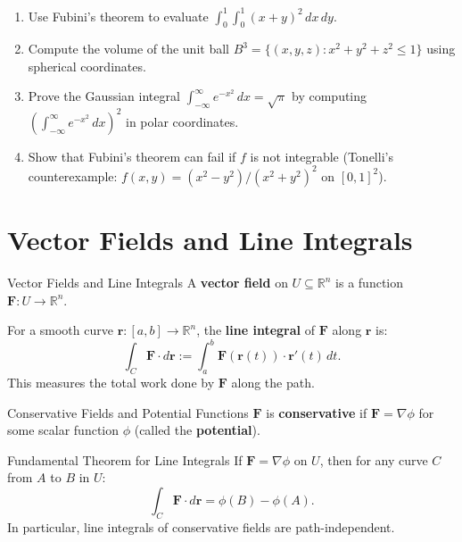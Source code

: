 \documentclass[12pt, openany]{book}
\theoremstyle{plain}
\theoremstyle{definition}
\theoremstyle{remark}
\newcommand{\R}{\mathbb{R}}
\begin{document}
\begin{exbox}
\begin{enumerate}
  \item Use Fubini's theorem to evaluate
        $\int_0^1\!\!\int_0^1 (x+y)^2\,dx\,dy$.
  \item Compute the volume of the unit ball $B^3=\{(x,y,z):x^2+y^2+z^2\leq 1\}$
        using spherical coordinates.
  \item Prove the Gaussian integral $\int_{-\infty}^{\infty}e^{-x^2}\,dx=\sqrt{\pi}$
        by computing $\left(\int_{-\infty}^\infty e^{-x^2}\,dx\right)^2$ in polar
        coordinates.
  \item Show that Fubini's theorem can fail if $f$ is not integrable (Tonelli's
        counterexample: $f(x,y)=(x^2-y^2)/(x^2+y^2)^2$ on $[0,1]^2$).
\end{enumerate}
\end{exbox}
\color{black}

\chapter{Vector Fields and Line Integrals}
\color{black}

\begin{defbox}{Vector Fields and Line Integrals}
A \textbf{vector field} on $U\subseteq\R^n$ is a function
$\mathbf{F}:U\to\R^n$.

For a smooth curve $\mathbf{r}:[a,b]\to\R^n$, the \textbf{line integral} of
$\mathbf{F}$ along $\mathbf{r}$ is:
\[\int_C \mathbf{F}\cdot d\mathbf{r}
  := \int_a^b \mathbf{F}(\mathbf{r}(t))\cdot\mathbf{r}'(t)\,dt.\]
This measures the total work done by $\mathbf{F}$ along the path.
\end{defbox}
\color{black}

\begin{defbox}{Conservative Fields and Potential Functions}
$\mathbf{F}$ is \textbf{conservative} if $\mathbf{F}=\nabla\phi$ for some scalar
function $\phi$ (called the \textbf{potential}).
\end{defbox}
\color{black}

\begin{thmbox}{Fundamental Theorem for Line Integrals}
If $\mathbf{F}=\nabla\phi$ on $U$, then for any curve $C$ from $A$ to $B$ in $U$:
\[\int_C \mathbf{F}\cdot d\mathbf{r} = \phi(B)-\phi(A).\]
In particular, line integrals of conservative fields are path-independent.
\end{thmbox}
\color{black}
\end{document}
